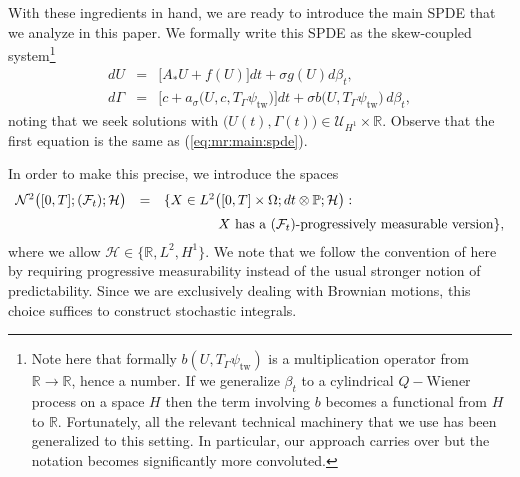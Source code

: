 \documentclass[10pt]{articleHJ}
\newcommand{\R}{\ensuremath{\mathbb{R}}}
\renewcommand{\b}{\ensuremath{\beta}}
\newcommand{\Real}{\mathbb{R}}							%
\newcommand{\sref}[1]{(\ref{#1})}                       %
\numberwithin{equation}{section}
\begin{document}
With these ingredients in hand, we are
ready to introduce the main SPDE that we analyze
in this paper.
We formally write this SPDE
as the skew-coupled system\footnote{
Note here that formally $b(U, T_{\Gamma} \psi_{\mathrm{tw}})$ is a multiplication
operator from $\R\to\R$, hence a number.
If we generalize $\b_t$ to a cylindrical $Q-$Wiener process on a space $H$
then the term involving $b$ becomes a functional from $H$ to $\R$. Fortunately,
all the relevant technical machinery that we use
has been generalized to this setting. In particular, our approach
carries over but the notation becomes significantly more convoluted.
}
%
\begin{equation}
\label{eq:mr:formal:spde}
\begin{array}{lcl}
dU &= &
  \big[ A_* U + f(U) \big] dt
  + \sigma g(U) d \beta_t,
\\[0.2cm]
d\Gamma & = &
  \big[ c + a_\sigma \big( U ,c, T_{\Gamma} \psi_{\mathrm{tw}} \big)
  \big] dt
  + \sigma b\big(U , T_{\Gamma} \psi_{\mathrm{tw}} \big)
     \, d \beta_t ,
\end{array}
\end{equation}
noting that we seek solutions
with
$\big(U(t), \Gamma(t) \big) \in \mathcal{U}_{H^1} \times \Real$.
Observe that the first equation is the same as \sref{eq:mr:main:spde}.

In order to make this precise,
we introduce the spaces
\begin{equation}
\begin{array}{lcl}
\mathcal{N}^2\big( [0,T] ; (\mathcal{F}_t ) ;
   \mathcal{H} \big)
& = & \{ X \in L^2\big( [0 , T] \times \Omega ;
  dt \otimes \mathbb{P} ;  \mathcal{H} \big)
    :
\\[0.2cm]
& & \qquad \qquad X \hbox{ has a }
    (\mathcal{F}_t)\hbox{-progressively measurable version}
 \},
\end{array}
\end{equation}
where we allow
$\mathcal{H} \in \{ \Real, L^2, H^1 \}$.
We note that we follow
the convention of \cite{Concise,revuz2013continuous}
here by requiring progressive measurability
instead of the usual stronger notion of predictability.
Since we are exclusively dealing with Brownian motions,
this choice suffices to construct
stochastic integrals.
\end{document}
